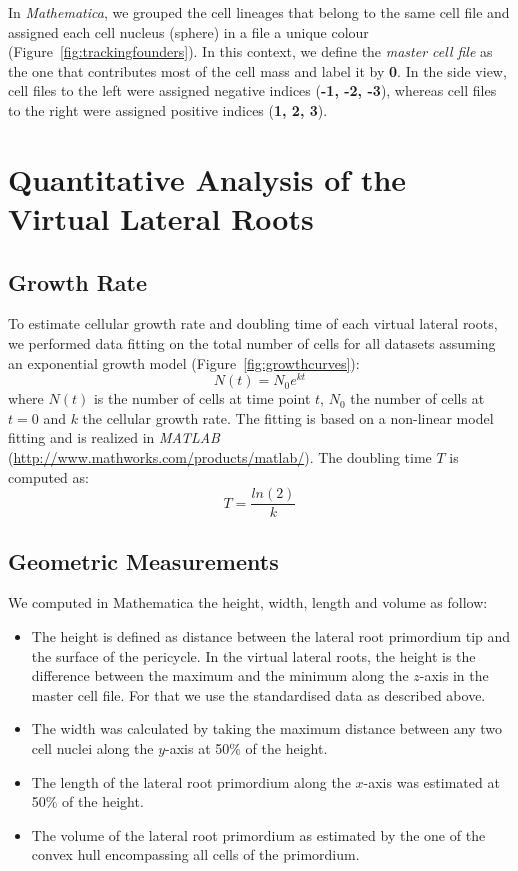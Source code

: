 \documentclass[11pt,a4paper, final]{article}
\newenvironment{Itemize}{
 \begin{itemize}[leftmargin=0.5cm]{
}}{\end{itemize}}
\begin{document}
In \textit{Mathematica}, we grouped the cell lineages that belong to the same cell file and assigned each cell nucleus (sphere) in a file a unique colour (Figure~\ref{fig:trackingfounders}). In this context, we define the \textit{master cell file} as the one that contributes most of the cell mass and label it by \textbf{0}. In the side view, cell files to the left were assigned negative indices (\textbf{-1, -2, -3}), whereas cell files to the right were assigned positive indices (\textbf{1, 2, 3}).

\clearpage
\section{Quantitative Analysis of the Virtual Lateral Roots}
\subsection{Growth Rate}
To estimate cellular growth rate and doubling time of each virtual lateral roots, we performed data fitting on the total number of cells for all datasets assuming an exponential growth model (Figure~\ref{fig:growthcurves}):
\begin{equation}
N(t)=N_0e^{kt}
\end{equation} 
where $N(t)$ is the number of cells at time point $t$, $N_0$ the number of cells at $t=0$ and $k$ the cellular growth rate. The fitting is based on a non-linear model fitting and is realized in \textit{MATLAB} (\href{http://www.mathworks.com/products/matlab/}{http://www.mathworks.com/products/matlab/}).
The doubling time $T$ is computed as:
\begin{equation}
T=\frac{ln(2)}{k}
\end{equation}

\subsection{Geometric Measurements}
We computed in Mathematica the height, width, length and volume as follow:
\begin{Itemize}
 \item The height is defined as distance between the lateral root primordium tip and the surface of the pericycle. In the virtual lateral roots, the height is the difference between the maximum and the minimum along the $z$-axis in the master cell file. For that we use the standardised data as described above.
 \item The width was calculated by taking the maximum distance between any two cell nuclei along the $y$-axis at 50\% of the height.
 \item The length of the lateral root primordium along the $x$-axis was estimated at 50\% of the height. 
 \item The volume of the lateral root primordium as estimated by the one of the convex hull encompassing all cells of the primordium.
\end{Itemize} 
\end{document}
